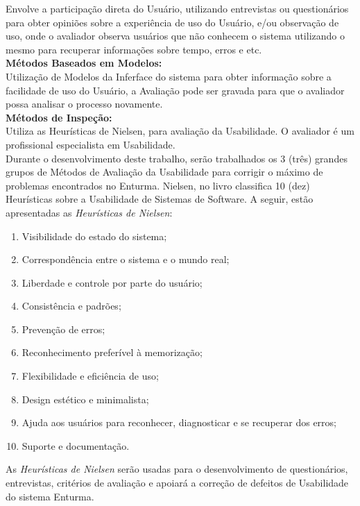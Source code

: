 	Envolve a participação direta do Usuário, utilizando entrevistas ou questionários para obter opiniões sobre a experiência de uso do Usuário, e/ou observação de uso, onde o avaliador observa usuários que não conhecem o sistema utilizando o mesmo para recuperar informações sobre tempo, erros e etc. \\

\textbf{Métodos Baseados em Modelos:}
	\\

	Utilização de Modelos da Inferface do sistema para obter informação sobre a facilidade de uso do Usuário, a Avaliação pode ser gravada para que o avaliador possa analisar o processo novamente. \\

\textbf{Métodos de Inspeção:}
	\\

	Utiliza as Heurísticas de Nielsen, \cite{usabilidade_interfaces} para avaliação da Usabilidade. O avaliador é um profissional especialista em Usabilidade. \\

	Durante o desenvolvimento deste trabalho, serão trabalhados os 3 (três) grandes grupos de Métodos de Avaliação da Usabilidade para corrigir o máximo de problemas encontrados no Enturma. Nielsen, no livro \cite{usabilidade_web} classifica 10 (dez) Heurísticas sobre a Usabilidade de Sistemas de Software. A seguir, estão apresentadas as \textit{Heurísticas de Nielsen}:

\begin{enumerate}
  \item Visibilidade do estado do sistema;
  \item Correspondência entre o sistema e o mundo real;
  \item Liberdade e controle por parte do usuário;
  \item Consistência e padrões;
  \item Prevenção de erros;
  \item Reconhecimento preferível à memorização;
  \item Flexibilidade e eficiência de uso;
  \item Design estético e minimalista;
  \item Ajuda aos usuários para reconhecer, diagnosticar e se recuperar dos erros;
  \item Suporte e documentação.
\end{enumerate}

	As \textit{Heurísticas de Nielsen} serão usadas para o desenvolvimento de questionários, entrevistas, critérios de avaliação e apoiará a correção de defeitos de Usabilidade do sistema Enturma.